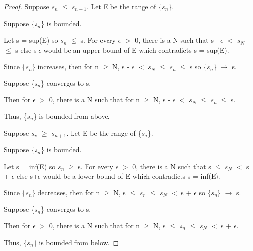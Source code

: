     \begin{proof}
        Suppose $s_n$ $\leq$ $s_{n+1}$.
        Let E be the range of \{$s_n$\}.
        
        Suppose \{$s_n$\} is bounded.
        
        Let s = sup(E) so $s_n$ $\leq$ s.
        For every $\epsilon$ $>$ 0, there is a N such that
        s - $\epsilon$ $<$ $s_N$ $\leq$ s
        else s-$\epsilon$ would be an upper bound of E
        which contradicts s = sup(E).

        Since \{$s_n$\} increases, then for n $\geq$ N,
        s - $\epsilon$ $<$ $s_N$ $\leq$ $s_n$ $\leq$ s
        so \{$s_n$\} $\rightarrow$ s.

        \vspace{0.2cm}

        Suppose \{$s_n$\} converges to s.

        Then for $\epsilon$ $>$ 0, there is a N such that for n $\geq$ N,
        s - $\epsilon$ $<$ $s_N$ $\leq$ $s_n$ $\leq$ s.

        Thus, \{$s_n$\} is bounded from above.

        \vspace{0.4cm}

        Suppose $s_n$ $\geq$ $s_{n+1}$. Let E be the range of \{$s_n$\}.

        Suppose \{$s_n$\} is bounded.

        Let s = inf(E) so $s_n$ $\geq$ s.
        For every $\epsilon$ $>$ 0, there is a N such that
        s $\leq$ $s_N$ $<$ s + $\epsilon$
        else s+$\epsilon$ would be a lower bound of E
        which contradicts s = inf(E).

        Since \{$s_n$\} decreases, then for n $\geq$ N,
        s $\leq$ $s_n$ $\leq$ $s_N$ $<$ s + $\epsilon$
        so \{$s_n$\} $\rightarrow$ s.

        \vspace{0.2cm}

        Suppose \{$s_n$\} converges to s.

        Then for $\epsilon$ $>$ 0, there is a N such that for n $\geq$ N,
        s $\leq$ $s_n$ $\leq$ $s_N$ $<$ s + $\epsilon$.

        Thus, \{$s_n$\} is bounded from below.
    \end{proof}	




